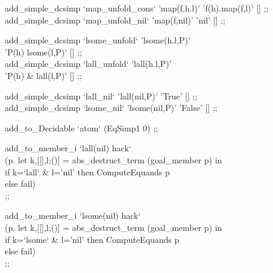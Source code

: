 \begin{prl*}
\>  add\_simple\_dcsimp `map\_unfold\_cons` 'map(f,h.l)' 'f(h).map(f,l)' [] ;;\\
\>  add\_simple\_dcsimp `map\_unfold\_nil` 'map(f,nil)' 'nil' [] ;;
\end{prl*}

\begin{prl*}
\>  add\_simple\_dcsimp `lsome\_unfold` 'lsome(h.l,P)' \\
\>      'P(h) \mvee{} lsome(l,P)' [] ;;\\
\>  add\_simple\_dcsimp `lall\_unfold` 'lall(h.l,P)' \\
\>      'P(h) \& lall(l,P)' [] ;;
\end{prl*}

\begin{prl*}
\>  add\_simple\_dcsimp `lall\_nil` 'lall(nil,P)' 'True' [] ;;\\
\>  add\_simple\_dcsimp `lsome\_nil` 'lsome(nil,P)' 'False' [] ;;
\end{prl*}

\begin{prl*}
\>  add\_to\_Decidable `atom` (EqSimp1 0) ;; 
\end{prl*}

\begin{prl*}
\>  add\_to\_member\_i `lall(nil) hack` \\
\>  (\mbackslash{}p. let k,[[],l;()] = abs\_destruct\_term (goal\_member p) in\\
\>       if k=`lall` \& l='nil' then ComputeEquands p\\
\>       else fail)\\
\>  ;;
\end{prl*}

\begin{prl*}
\>  add\_to\_member\_i `lsome(nil) hack` \\
\>  (\mbackslash{}p. let k,[[],l;()] = abs\_destruct\_term (goal\_member p) in\\
\>       if k=`lsome` \& l='nil' then ComputeEquands p\\
\>       else fail)\\
\>  ;;
\end{prl*}

